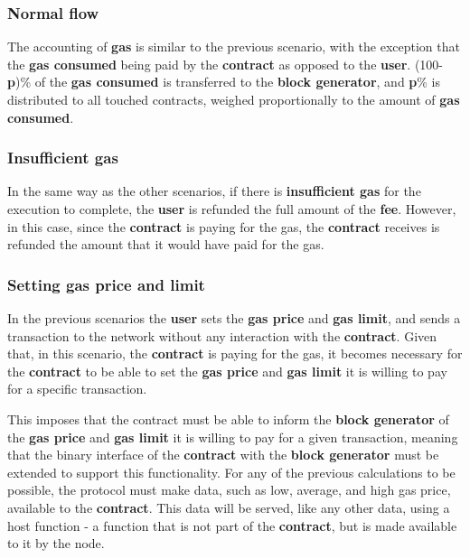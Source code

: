 \documentclass[twocolumn, nofootinbib]{revtex4-2} %
\newcommand{\emphasize}[1]{\textbf{#1}\xspace}
\newcommand{\blockgenerator}{\emphasize{block generator}}
\newcommand{\contract}{\emphasize{contract}}
\newcommand{\fee}{\emphasize{fee}}
\newcommand{\gas}{\emphasize{gas}}
\newcommand{\gasprice}{\emphasize{gas price}}
\newcommand{\gaslimit}{\emphasize{gas limit}}
\newcommand{\gasconsumed}{\emphasize{gas consumed}}
\newcommand{\insufficientgas}{\emphasize{insufficient gas}}
\newcommand{\user}{\emphasize{user}}
\newcommand{\emphp}{\emphasize{p}}
\begin{document}
    \subsubsection*{Normal flow}\label{subsubsec:scenario-3-normal-flow}
    The accounting of \gas is similar to the previous scenario, with the exception
    that the \gasconsumed being paid by the \contract as opposed to the \user.
    (100-\emphp)\% of the \gasconsumed is transferred to the \blockgenerator, and
    \emphp\% is distributed to all touched contracts, weighed proportionally to the
    amount of \gasconsumed.

    \subsubsection*{Insufficient gas}\label{subsubsec:scenario-3-insufficient-gas}
    In the same way as the other scenarios, if there is \insufficientgas for the
    execution to complete, the \user is refunded the full amount of the \fee.
    However, in this case, since the \contract is paying for the gas, the \contract
    receives is refunded the amount that it would have paid for the gas.

    \subsubsection*{Setting gas price and limit}\label{subsubsec:scenario-3-setting-gas-price-and-limit}
    In the previous scenarios the \user sets the \gasprice and \gaslimit, and
    sends a transaction to the network without any interaction with the \contract.
    Given that, in this scenario, the \contract is paying for the gas, it becomes
    necessary for the \contract to be able to set the \gasprice and \gaslimit it
    is willing to pay for a specific transaction.

    This imposes that the contract must be able to inform the \blockgenerator of
    the \gasprice and \gaslimit it is willing to pay for a given transaction,
    meaning that the binary interface of the \contract with the \blockgenerator
    must be extended to support this functionality.
    For any of the previous calculations to be possible, the protocol must make
    data, such as low, average, and high gas price, available to the \contract.
    This data will be served, like any other data, using a host function - a
    function that is not part of the \contract, but is made available to it
    by the node.
\end{document}
